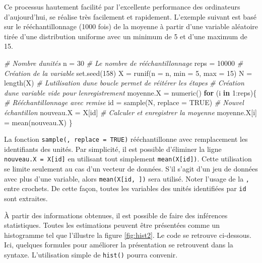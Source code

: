 \documentclass[
]{book}
\newenvironment{Shaded}{}{}
\newcommand{\AttributeTok}[1]{#1}
\newcommand{\CommentTok}[1]{\textit{#1}}
\newcommand{\ConstantTok}[1]{#1}
\newcommand{\ControlFlowTok}[1]{\textbf{#1}}
\newcommand{\DecValTok}[1]{#1}
\newcommand{\FunctionTok}[1]{#1}
\newcommand{\NormalTok}[1]{#1}
\newcommand{\OtherTok}[1]{#1}
\newcommand{\SpecialCharTok}[1]{#1}
\begin{document}
Ce processus hautement facilité par l'excellente performance des ordinateurs d'aujourd'hui, se réalise très facilement et rapidement. L'exemple suivant est basé sur le rééchantillonnage (1000 fois) de la moyenne à partir d'une variable aléatoire tirée d'une distribution uniforme avec un minimum de 5 et d'une maximum de 15.

\begin{Shaded}
\begin{Highlighting}[]
\CommentTok{\# Nombre d\textquotesingle{}unités}
\NormalTok{n }\OtherTok{=} \DecValTok{30}
\CommentTok{\# Le nombre de rééchantillonnage}
\NormalTok{reps }\OtherTok{=} \DecValTok{10000}
\CommentTok{\# Création de la variable}
\FunctionTok{set.seed}\NormalTok{(}\DecValTok{158}\NormalTok{)}
\NormalTok{X }\OtherTok{=} \FunctionTok{runif}\NormalTok{(}\AttributeTok{n =}\NormalTok{ n, }\AttributeTok{min =} \DecValTok{5}\NormalTok{, }\AttributeTok{max =} \DecValTok{15}\NormalTok{)}
\NormalTok{N }\OtherTok{=} \FunctionTok{length}\NormalTok{(X)}
\CommentTok{\# L\textquotesingle{}utilisation d\textquotesingle{}une boucle permet de réitérer les étapes}
\CommentTok{\# Création d\textquotesingle{}une variable vide pour l\textquotesingle{}enregistrement}
\NormalTok{moyenne.X }\OtherTok{=} \FunctionTok{numeric}\NormalTok{()}
\ControlFlowTok{for}\NormalTok{ (i }\ControlFlowTok{in} \DecValTok{1}\SpecialCharTok{:}\NormalTok{reps)\{}
  \CommentTok{\# Rééchantillonnage avec remise}
\NormalTok{  id }\OtherTok{=} \FunctionTok{sample}\NormalTok{(N, }\AttributeTok{replace =} \ConstantTok{TRUE}\NormalTok{)}
  \CommentTok{\# Nouvel échantillon}
\NormalTok{  nouveau.X }\OtherTok{=}\NormalTok{ X[id]}
  \CommentTok{\# Calculer et enregistrer la moyenne}
\NormalTok{  moyenne.X[i] }\OtherTok{=} \FunctionTok{mean}\NormalTok{(nouveau.X)}
\NormalTok{\}}
\end{Highlighting}
\end{Shaded}

La fonction \texttt{sample(,\ replace\ =\ TRUE)} rééchantillonne avec remplacement les identifiants des unités. Par simplicité, il est possible d'éliminer la ligne \texttt{nouveau.X\ =\ X{[}id{]}} en utilisant tout simplement \texttt{mean(X{[}id{]})}. Cette utilisation se limite seulement au cas d'un vecteur de données. S'il s'agit d'un jeu de données avec plus d'une variable, alors \texttt{mean(X{[}id,\ {]})} sera utilisé. Noter l'usage de la \texttt{,} entre crochets. De cette façon, toutes les variables des unités identifiées par \texttt{id} sont extraites.

À partir des informations obtenues, il est possible de faire des inférences statistiques. Toutes les estimations peuvent être présentées comme un histogramme tel que l'illustre la figure \ref{fig:hist2}. Le code se retrouve ci-dessous. Ici, quelques formules pour améliorer la présentation se retrouvent dans la syntaxe. L'utilisation simple de \texttt{hist()} pourra convenir.
\end{document}

